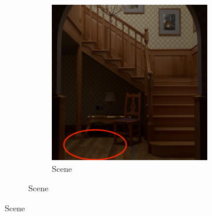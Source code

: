 \begin{figure}[]
    \centering    
    \begin{subfigure}{\textwidth}
        \centering
        \begin{subfigure}{0.5\textwidth}
            \centering
            \includegraphics[width=\textwidth]{images/04-experiment03/staircase_illum/scene_raw_highlighted.jpg}
            \caption{Scene}
            \label{fig:ex03-staircase_illum-scene}
        \end{subfigure}


\end{subfigure}
\end{figure}
